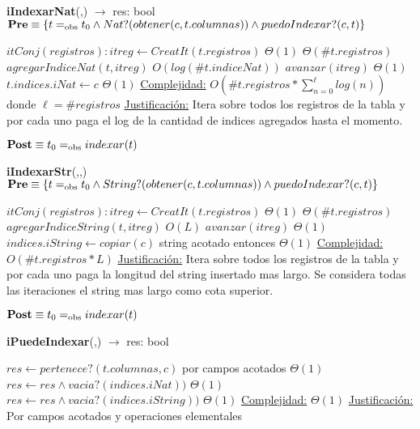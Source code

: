 \begin{algorithm}[H]{\textbf{iIndexarNat}(,) $\to$ res: bool}
	{\\ $\textbf{Pre} \equiv \{ t =_{\mathrm{obs}} t_0 \land Nat?(obtener(c,t.columnas)) \land puedoIndexar?(c,t)\}$}
	\begin{algorithmic}[1]
		\State $itConj(registros):itreg \gets CreatIt(t.registros)$ \Comment $\Theta(1)$
		 \Comment $\Theta(\#t.registros)$
			\State $agregarIndiceNat(t,itreg)$ \Comment $O(log(\#t.indiceNat))$
			\State $avanzar(itreg)$	\Comment $\Theta(1)$
		\EndWhile
		\State $t.indices.iNat \gets c$	\Comment $\Theta(1)$
		\medskip
		\Statex \underline{Complejidad:} $O\left(\#t.registros * \displaystyle\sum_{n = 0}^{\ell}{log(n)}\right)$ donde $\ell = \#registros$
		\Statex \underline{Justificación:} Itera sobre todos los registros de la tabla y por cada uno paga el log de la cantidad de indices agregados hasta el momento.
	\end{algorithmic}
	{$\textbf{Post} \equiv t_0 =_{\mathrm{obs}} indexar(t)$}
\end{algorithm}

\begin{algorithm}[H]{\textbf{iIndexarStr}(,,)}
	{\\ $\textbf{Pre} \equiv \{t =_{\mathrm{obs}} t_0 \land String?(obtener(c,t.columnas)) \land puedoIndexar?(c,t)\}$}
	\begin{algorithmic}[1]
		\State $itConj(registros):itreg \gets CreatIt(t.registros)$ \Comment $\Theta(1)$
		 \Comment $\Theta(\#t.registros)$
			\State $agregarIndiceString(t,itreg)$ \Comment $O(L)$
			\State $avanzar(itreg)$	\Comment $\Theta(1)$
		\EndWhile
		\State $indices.iString \gets copiar(c)$	\Comment string acotado entonces $\Theta(1)$
		\medskip
		\Statex \underline{Complejidad:} $O(\#t.registros * L)$
		\Statex \underline{Justificación:} Itera sobre todos los registros de la tabla y por cada uno paga la longitud del string insertado mas largo. Se considera todas las iteraciones el string mas largo como cota superior. 
	\end{algorithmic}
	{$\textbf{Post} \equiv t_0 =_{\mathrm{obs}} indexar(t)$}
\end{algorithm}

\begin{algorithm}[H]{\textbf{iPuedeIndexar}(,) $\to$ res: bool}
	\begin{algorithmic}[1]
		\State $res \gets pertenece?(t.columnas,c)$	\Comment por campos acotados $\Theta(1)$
			\State $res \gets res \land vacia?(indices.iNat))$ \Comment $\Theta(1)$
		\Else
			\State $res \gets res \land vacia?(indices.iString))$ \Comment $\Theta(1)$
		\EndIf
		\medskip
		\Statex \underline{Complejidad:} $\Theta(1)$
		\Statex \underline{Justificación:} Por campos acotados y operaciones elementales
	\end{algorithmic}
\end{algorithm}

